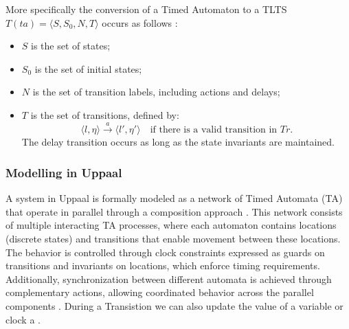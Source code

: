 More specifically the conversion of a Timed Automaton to a TLTS \( T(ta) = \langle S, S_0, N, T \rangle \) occurs as follows \cite{baier2008principles}:

\begin{itemize}
    \item \( S \) is the set of states;
    \item \( S_0 \) is the set of initial states;
    \item \( N \) is the set of transition labels, including actions and delays;
    \item \( T \) is the set of transitions, defined by:
    \[
        \langle l, \eta \rangle \xrightarrow{a} \langle l', \eta' \rangle \quad \text{if there is a valid transition in } Tr.
    \]
    The delay transition occurs as long as the state invariants are maintained.
\end{itemize}




\subsubsection*{Modelling in Uppaal}


A system in Uppaal is formally modeled as a network of Timed Automata (TA) that operate in parallel through a composition approach \cite{proenca-spreadsheet-2023}. This network consists of multiple interacting TA processes, where each automaton contains locations (discrete states) and transitions that enable movement between these locations. The behavior is controlled through clock constraints expressed as guards on transitions and invariants on locations, which enforce timing requirements. Additionally, synchronization between different automata is achieved through complementary actions, allowing coordinated behavior across the parallel components \cite{Behrmann2006}. During a Transistion we can also update the value of a variable or clock a \cite{upp}.


